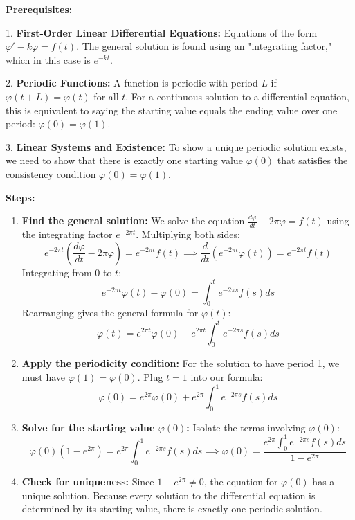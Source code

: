 \begin{solution}
\textbf{Prerequisites:}

1. \textbf{First-Order Linear Differential Equations:} Equations of the form $\varphi' - k\varphi = f(t)$. The general solution is found using an "integrating factor," which in this case is $e^{-kt}$.

2. \textbf{Periodic Functions:} A function is periodic with period $L$ if $\varphi(t+L) = \varphi(t)$ for all $t$. For a continuous solution to a differential equation, this is equivalent to saying the starting value equals the ending value over one period: $\varphi(0) = \varphi(1)$.

3. \textbf{Linear Systems and Existence:} To show a unique periodic solution exists, we need to show that there is exactly one starting value $\varphi(0)$ that satisfies the consistency condition $\varphi(0) = \varphi(1)$.


\textbf{Steps:}
\begin{enumerate}
    \item \textbf{Find the general solution:}
        We solve the equation $\frac{d\varphi}{dt} - 2\pi\varphi = f(t)$ using the integrating factor $e^{-2\pi t}$. Multiplying both sides:
        \[ e^{-2\pi t} \left(\frac{d\varphi}{dt} - 2\pi\varphi\right) = e^{-2\pi t} f(t) \implies \frac{d}{dt} (e^{-2\pi t} \varphi(t)) = e^{-2\pi t} f(t) \]
        Integrating from $0$ to $t$:
        \[ e^{-2\pi t} \varphi(t) - \varphi(0) = \int_0^t e^{-2\pi s} f(s) ds \]
        Rearranging gives the general formula for $\varphi(t)$:
        \[ \varphi(t) = e^{2\pi t} \varphi(0) + e^{2\pi t} \int_0^t e^{-2\pi s} f(s) ds \]

\item \textbf{Apply the periodicity condition:}
    For the solution to have period 1, we must have $\varphi(1) = \varphi(0)$. Plug $t=1$ into our formula:
    \[ \varphi(0) = e^{2\pi} \varphi(0) + e^{2\pi} \int_0^1 e^{-2\pi s} f(s) ds \]

\item \textbf{Solve for the starting value $\varphi(0)$:}
    Isolate the terms involving $\varphi(0)$:
    \[ \varphi(0) (1 - e^{2\pi}) = e^{2\pi} \int_0^1 e^{-2\pi s} f(s) ds \implies \varphi(0) = \frac{e^{2\pi} \int_0^1 e^{-2\pi s} f(s) ds}{1 - e^{2\pi}} \]

\item \textbf{Check for uniqueness:}
    Since $1 - e^{2\pi} \neq 0$, the equation for $\varphi(0)$ has a unique solution. Because every solution to the differential equation is determined by its starting value, there is exactly one periodic solution.
\end{enumerate}


\end{solution}
